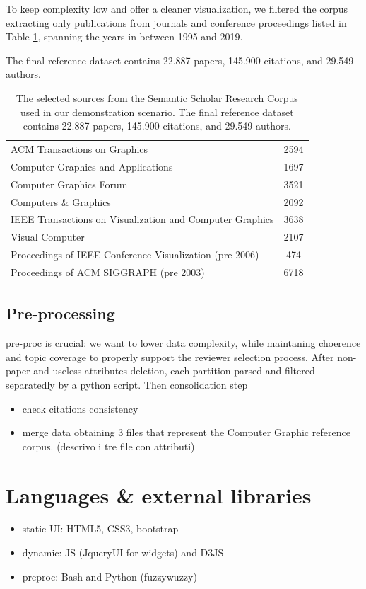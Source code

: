 To keep complexity low and offer a cleaner visualization, we filtered the corpus extracting only publications from journals and conference proceedings listed in Table \ref{table:sources}, spanning the years in-between 1995 and 2019. 

The final reference dataset contains 22.887 papers, 145.900 citations, and 29.549 authors.
\begin{table}[!h]
\renewcommand{\arraystretch}{1.3}
\centering
\begin{tabular}{|l|c|}
\hline
ACM Transactions on Graphics & 2594\\ 
Computer Graphics and Applications  & 1697 \\ 
Computer Graphics Forum & 3521\\ 
Computers \& Graphics & 2092\\ 
IEEE Transactions on Visualization and Computer Graphics & 3638\\ 
Visual Computer & 2107\\ 
Proceedings of IEEE Conference Visualization (pre 2006) & 474 \\ 
Proceedings of ACM SIGGRAPH (pre 2003) & 6718\\
\hline
\end{tabular}
\caption{The selected sources from the Semantic Scholar Research Corpus used in our demonstration scenario. The final reference dataset contains 22.887 papers, 145.900 citations, and 29.549 authors.}
\label{table:sources}
\end{table}

%
\subsection*{Pre-processing}
\label{sec:preproc}

pre-proc is crucial: we want to lower data complexity, while maintaning choerence and topic coverage to properly support the reviewer selection process. After non-paper and useless attributes deletion, each partition parsed and filtered separatedly by a python script. Then consolidation step 
\begin{itemize}
    \item check citations consistency
    \item merge data obtaining 3 files that represent the Computer Graphic reference corpus. (descrivo i tre file con attributi)
\end{itemize}

\section{Languages \& external libraries}
\label{sec:lang}
\begin{itemize}
    \item static UI: HTML5, CSS3, bootstrap
    \item dynamic: JS (JqueryUI for widgets) and D3JS
    \item preproc: Bash and Python (fuzzywuzzy) 
\end{itemize}

